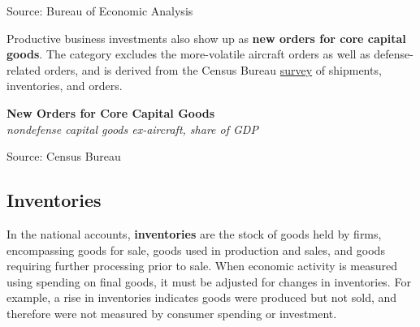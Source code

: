 \documentclass{report}
\makeatletter
\newcommand{\tbllink}[1]{\href{https://raw.githubusercontent.com/bdecon/US-chartbook/master/chartbook/data/#1}{\faTable}}
\newcommand*\short[1]{\expandafter\@gobbletwo\number\numexpr#1\relax}
\newcommand{\shdateaxisticks}{
		date coordinates in=x, axis line style={draw=none},
		xmax={2024-01-31},
		max space between ticks=40,	    
		xtick={{1990-01-01}, {1995-01-01}, {2000-01-01}, 
			{2005-01-01}, {2010-01-01}, {2015-01-01}, {2020-01-01}},
		minor xtick={},
		enlarge y limits={0.06}, enlarge x limits={0.01},
		xticklabel style={align=center, yshift=-2pt}, tick label style={inner sep=0pt},
		}
\newcommand{\bbar}[2]{extra #1 ticks = {{#2}}, extra #1 tick labels = ,
		extra #1 tick style = {grid=major, grid style={thick, black!25}},}
\newcommand{\thickline}[4]{\addplot[ultra thick, no markers, color=#1] 
		table [x=#2, y=#3, col sep=comma] {#4};	}
\newcommand{\rebars}{
		\fill[color=black!10] (axis cs:{2007-12-01},\pgfkeysvalueof{/pgfplots/ymin}) 
			rectangle (axis cs:{2009-07-01}, \pgfkeysvalueof{/pgfplots/ymax});
		\fill[color=black!10] (axis cs:{2001-03-01},\pgfkeysvalueof{/pgfplots/ymin}) 
			rectangle (axis cs:{2001-11-01}, \pgfkeysvalueof{/pgfplots/ymax});
		\fill[color=black!10] (axis cs:{2020-02-01},\pgfkeysvalueof{/pgfplots/ymin}) 
			rectangle (axis cs:{2020-05-01}, \pgfkeysvalueof{/pgfplots/ymax});}
\makeatother
\begin{document}
{\begin{minipage}{1.0\textwidth}
\footnotesize{Source: Bureau of Economic Analysis}
\end{minipage}
\newpage
{}  
\begin{minipage}{0.32\textwidth}
\small Productive business investments also show up as \textbf{new orders for core capital goods}. The category excludes the more-volatile aircraft orders as well as defense-related orders, and is derived from the Census Bureau \href{https://www.census.gov/manufacturing/m3/index.html}{survey} of shipments, inventories, and orders.  


\end{minipage} \hspace{5mm}
\begin{minipage}{0.4\textwidth}
\normalsize \textbf{New Orders for Core Capital Goods}\\
\footnotesize{\textit{nondefense capital goods ex-aircraft, share of GDP}}
\vspace{3.7cm}

\hspace{2mm} 

\footnotesize{Source: Census Bureau} \hfill \tbllink{dgno.csv} \ 
\end{minipage}
\vspace{10mm}

\begin{minipage}{1.0\textwidth}   
\subsection*{Inventories} 
\small In the national accounts, \textbf{inventories} are the stock of goods held by firms, encompassing goods for sale, goods used in production and sales, and goods requiring further processing prior to sale. When economic activity is measured using spending on final goods, it must be adjusted for changes in inventories. For example, a rise in inventories indicates goods were produced but not sold, and therefore were not measured by consumer spending or investment. 


\end{minipage}}
\end{document}
